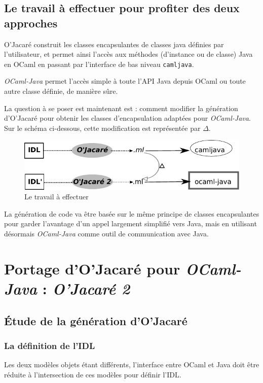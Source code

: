 \documentclass[a4paper, 11pt]{article}
\newcommand{\camljava}{{\tt{camljava}}}
\begin{document}

\subsection{Le travail à effectuer pour profiter des deux approches }
O'Jacaré construit les classes encapsulantes de classes
java définies par l'utilisateur, et permet ainsi l'accès aux méthodes
(d'instance ou de classe) Java en OCaml en passant par l'interface de bas niveau \camljava.

\emph{OCaml-Java} permet l'accès simple à toute l'API Java depuis OCaml ou toute autre classe définie, de manière sûre. 

La question à se poser est maintenant est : comment modifier la génération d’O’Jacaré pour obtenir les classes d’encapsulation adaptées pour \emph{OCaml-Java}. Sur le schéma ci-dessous, cette modification est représentée par $\Delta$.

\begin{figure}[h]
  \centering
  \includegraphics{schema1.pdf}
  \caption{Le travail à effectuer}
\end{figure}

La génération de code va être basée sur le même principe de classes encapsulantes pour garder l'avantage d'un appel largement simplifié vers Java, mais en utilisant désormais \emph{OCaml-Java} comme outil de communication avec Java.





\newpage
\section{Portage d'O'Jacaré pour \emph{OCaml-Java} : \emph{O'Jacaré 2} }


\subsection{\'Etude de la génération d'O'Jacaré}\label{2.1}
\subsubsection{La définition de l'IDL}
Les deux modèles objets étant différents, l'interface entre OCaml et Java doit être réduite à l'intersection de ces modèles pour définir l'IDL.
\end{document}
